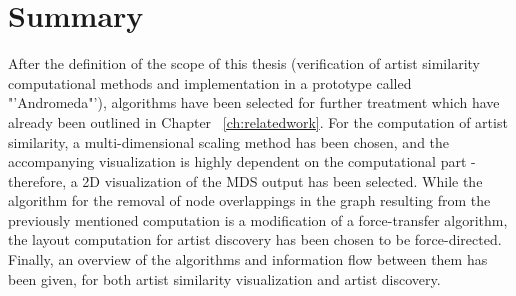 \section{Summary}

After the definition of the scope of this thesis (verification of artist similarity computational methods and implementation in a prototype called "'Andromeda"'), algorithms have been selected for further treatment which have already been outlined in Chapter ~\ref{ch:relatedwork}. For the computation of artist similarity, a multi-dimensional scaling method has been chosen, and the accompanying visualization is highly dependent on the computational part - therefore, a 2D visualization of the MDS output has been selected. 
While the algorithm for the removal of node overlappings in the graph resulting from the previously mentioned computation is a modification of a force-transfer algorithm, the layout computation for artist discovery has been chosen to be force-directed. Finally, an overview of the algorithms and information flow between them has been given, for both artist similarity visualization and artist discovery.